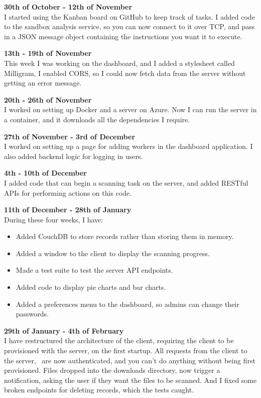 \textbf{30th of October - 12th of November} \\
I started using the Kanban board on GitHub to keep track of tasks.
I added code to the sandbox analysis service, so you can now connect to it over TCP,
and pass in a JSON message object containing the instructions you want it to execute.

\textbf{13th - 19th of November} \\
This week I was working on the dashboard, and I added a stylesheet called Milligram,
I enabled CORS, so I could now fetch data from the server without getting an error message.

\textbf{20th - 26th of November} \\
I worked on setting up Docker and a server on Azure.
Now I can run the server in a container, and it downloads all the dependencies I require.

\textbf{27th of November - 3rd of December} \\
I worked on setting up a page for adding workers in the dashboard application.
I also added backend logic for logging in users.

\textbf{4th - 10th of December} \\
I added code that can begin a scanning task on the server,
and added RESTful APIs for performing actions on this code.

\textbf{11th of December - 28th of January} \\
During these four weeks, I have:
\begin{itemize}
    \item Added CouchDB to store records rather than storing them in memory.
    \item Added a window to the client to display the scanning progress.
    \item Made a test suite to test the server API endpoints.
    \item Added code to display pie charts and bar charts.
    \item Added a preferences menu to the dashboard,
    so admins can change their passwords.
\end{itemize}

\textbf{29th of January - 4th of February} \\
I have restructured the architecture of the client,
requiring the client to be provisioned with the server, on the first startup.
All requests from the client to the server, 
are now authenticated, and you can't do anything without being first provisioned.
Files dropped into the downloads directory, now trigger a notification,
asking the user if they want the files to be scanned.
And I fixed some broken endpoints for deleting records, which the tests caught.

